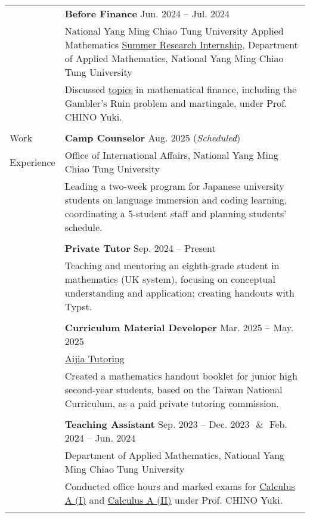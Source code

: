 \documentclass[letterpaper, 11pt]{article}
\begin{document}
\begin{center}
\begin{longtable}{p{0.81in}p{5.88in}}
        & \textbf{Before Finance} \hfill Jun. 2024 -- Jul. 2024\\
        & National Yang Ming Chiao Tung University Applied Mathematics \href{https://teshenglin.github.io/courses/2024_summer_research/}{Summer Research Internship}, Department of Applied Mathematics, National Yang Ming Chiao Tung University\\
        & Discussed \href{https://hackmd.io/@eiken-sc11/B1QcaW3B0}{topics} in mathematical finance, including the Gambler's Ruin problem and martingale, under Prof. CHINO Yuki.\\
        & \\
        

        
        {\textcolor{OliveGreen}{Work}} & \textbf{Camp Counselor} \hfill Aug. 2025 (\textit{Scheduled}) \\
        {\textcolor{OliveGreen}{Experience}} & Office of International Affairs, National Yang Ming Chiao Tung University \\
        & Leading a two-week program for Japanese university students on language immersion and coding learning, coordinating a 5-student staff and planning students' schedule. \\
        & \\

        & \textbf{Private Tutor} \hfill Sep. 2024 -- Present \\
        & Teaching and mentoring an eighth-grade student in mathematics (UK system), focusing on conceptual understanding and application; creating handouts with Typst.\\
        & \\
        
        & \textbf{Curriculum Material Developer} \hfill Mar. 2025 -- May. 2025 \\
        & \href{https://www.instagram.com/aijiatutoring/}{Aijia Tutoring}\\
        & Created a mathematics handout booklet for junior high second-year students, based on the Taiwan National Curriculum, as a paid private tutoring commission.\\
        & \\

        & \textbf{Teaching Assistant}  \hfill Sep. 2023 -- Dec. 2023\ \,\&\ \,Feb. 2024 -- Jun. 2024 \\
        & Department of Applied Mathematics, National Yang Ming Chiao Tung University\\
        & Conducted office hours and marked exams for \href{https://reurl.cc/Djp5jN}{Calculus A (I)} and \href{https://reurl.cc/RqoMez}{Calculus A (II)} under Prof. CHINO Yuki.\\
        & \\


\end{longtable}
\end{center}
\end{document}
